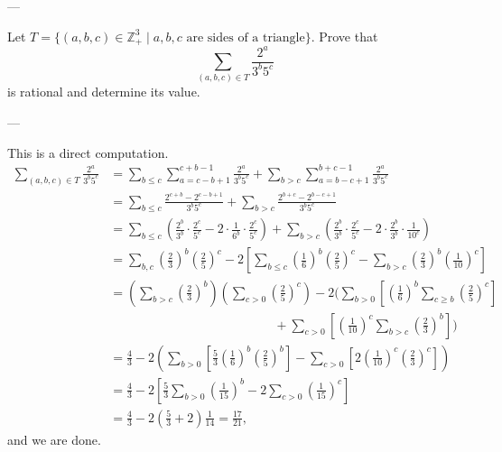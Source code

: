 
---

Let $T=\{(a,b,c)\in\mathbb Z_+^3\mid a,b,c\text{ are sides of a triangle}\}$. Prove that \[\sum_{(a,b,c)\in T}\frac{2^a}{3^b5^c}\]
is rational and determine its value.

---

This is a direct computation.
\begin{align*}
    \sum_{(a,b,c)\in T}\frac{2^a}{3^b5^c}&=\sum_{b\le c}\sum_{a=c-b+1}^{c+b-1}\frac{2^a}{3^b5^c}+\sum_{b>c}\sum_{a=b-c+1}^{b+c-1}\frac{2^a}{3^b5^c}\\
    &=\sum_{b\le c}\frac{2^{c+b}-2^{c-b+1}}{3^b5^c}+\sum_{b>c}\frac{2^{b+c}-2^{b-c+1}}{3^b5^c}\\
    &=\sum_{b\le c}\left(\frac{2^b}{3^b}\cdot\frac{2^c}{5^c}-2\cdot\frac1{6^b}\cdot\frac{2^c}{5^c}\right)+\sum_{b>c}\left(\frac{2^b}{3^b}\cdot\frac{2^c}{5^c}-2\cdot\frac{2^b}{3^b}\cdot\frac1{10^c}\right)\\
    &=\sum_{b,c}\left(\frac23\right)^b\left(\frac25\right)^c-2\left[\sum_{b\le c}\left(\frac16\right)^b\left(\frac25\right)^c-\sum_{b>c}\left(\frac23\right)^b\left(\frac1{10}\right)^c\right]\\
    &=\left(\sum_{b>c}\left(\frac23\right)^b\right)\left(\sum_{c>0}\left(\frac25\right)^c\right)-2\Bigg(\sum_{b>0}\left[\left(\frac16\right)^b\sum_{c\ge b}\left(\frac25\right)^c\right]\\
    &\hspace{13em}+\sum_{c>0}\left[\left(\frac1{10}\right)^c\sum_{b>c}\left(\frac23\right)^b\right]\Bigg)\\
    &=\frac43-2\left(\sum_{b>0}\left[\frac53\left(\frac16\right)^b\left(\frac25\right)^b\right]-\sum_{c>0}\left[2\left(\frac1{10}\right)^c\left(\frac23\right)^c\right]\right)\\
    &=\frac43-2\left[\frac53\sum_{b>0}\left(\frac1{15}\right)^b-2\sum_{c>0}\left(\frac1{15}\right)^c\right]\\
    &=\frac43-2\left(\frac53+2\right)\frac1{14}=\frac{17}{21},
\end{align*}
and we are done.
